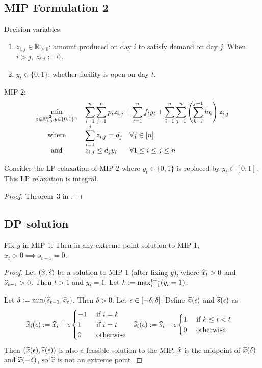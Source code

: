 \documentclass[a4paper,12pt,fleqn]{article}
\newenvironment*{tightenum}{\begin{enumerate}[noitemsep]}{\end{enumerate}}
\newcommand*{\Rpos}{\mathbb{R}_{\ge 0}}
\newcommand*{\optprog}[3]{
\begin{array}{{>{\displaystyle}c}*2{>{\displaystyle}l}}
#1 & \multicolumn{2}{>{\displaystyle}l}{#2}
#3 \end{array}}
\begin{document}
\subsection{MIP Formulation 2}

Decision variables:
\begin{tightenum}
\item $z_{i,j} \in \Rpos$: amount produced on day $i$ to satisfy demand on day $j$.
    When $i > j$, $z_{i,j} := 0$.
\item $y_t \in \{0, 1\}$: whether facility is open on day $t$.
\end{tightenum}

MIP 2:
\[ \optprog{\min_{z \in \Rpos^{n^2}, y \in \{0, 1\}^n}}{%
\sum_{i=1}^n\sum_{j=1}^n p_iz_{i,j} + \sum_{t=1}^n f_ty_t
    + \sum_{i=1}^n\sum_{j=1}^n\left(\sum_{k=i}^{j-1} h_k\right)z_{i,j}}{
\\ \textrm{where} & \sum_{i=1}^j z_{i,j} = d_j & \forall j \in [n]
\\ \textrm{and} & z_{i,j} \le d_jy_i & \forall 1 \le i \le j \le n
} \]

\begin{theorem}
Consider the LP relaxation of MIP 2 where $y_t \in \{0, 1\}$ is replaced by $y_t \in [0, 1]$.
This LP relaxation is integral.
\end{theorem}
\begin{proof}
Theorem~3 in \cite{barany1984uncapacitated}.
\end{proof}

\subsection{DP solution}

\begin{lemma}
\label{thm:lot:zio}
Fix $y$ in MIP 1. Then in any extreme point solution to MIP 1, $x_t > 0 \implies s_{t-1} = 0$.
\end{lemma}
\begin{proof}
Let $(\widehat{x}, \widehat{s})$ be a solution to MIP 1 (after fixing $y$),
where $\widehat{x}_t > 0$ and $\widehat{s}_{t-1} > 0$. Then $t > 1$ and $y_t = 1$.
Let $k := \max_{i=1}^{t-1} (y_i = 1)$.

Let $\delta := \min(\widehat{s}_{t-1}, \widehat{x}_t)$.
Then $\delta > 0$. Let $\epsilon \in [-\delta, \delta]$.
Define $\widetilde{x}(\epsilon)$ and $\widetilde{s}(\epsilon)$ as
\begin{align*}
\widetilde{x}_i(\epsilon) &:= \widehat{x}_i + \epsilon\begin{cases}
-1 & \textrm{ if } i = k
\\ 1 & \textrm{ if } i = t
\\ 0 & \textrm{ otherwise}
\end{cases}
& \widetilde{s}_i(\epsilon) &:= \widehat{s}_i - \epsilon\begin{cases}
1 & \textrm{ if } k \le i < t
\\ 0 & \textrm{ otherwise}
\end{cases}
\end{align*}
Then $(\widetilde{x}(\epsilon), \widetilde{s}(\epsilon))$ is also a feasible solution to the MIP.
$\widehat{x}$ is the midpoint of $\widetilde{x}(\delta)$ and $\widetilde{x}(-\delta)$,
so $\widehat{x}$ is not an extreme point.
\end{proof}
\end{document}
